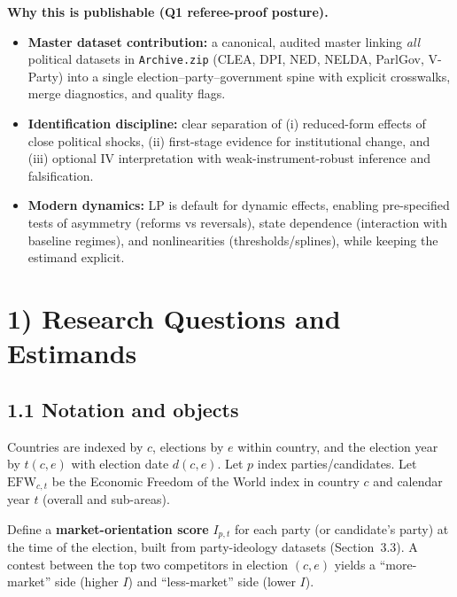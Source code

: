 \documentclass[11pt]{article}
\newcommand{\EFW}{\mathrm{EFW}}
\newcommand{\IV}{\mathrm{IV}}
\newcommand{\1}{\mathbf{1}}
\newcommand{\cid}{c}
\newcommand{\eid}{e}
\begin{document}
\textbf{Why this is publishable (Q1 referee-proof posture).}
\begin{itemize}[leftmargin=1.2em]
\item \textbf{Master dataset contribution:} a canonical, audited master linking \emph{all} political datasets in \texttt{Archive.zip} (CLEA, DPI, NED, NELDA, ParlGov, V-Party) into a single election--party--government spine with explicit crosswalks, merge diagnostics, and quality flags.
\item \textbf{Identification discipline:} clear separation of (i) reduced-form effects of close political shocks, (ii) first-stage evidence for institutional change, and (iii) optional $\IV$ interpretation with weak-instrument-robust inference and falsification.
\item \textbf{Modern dynamics:} LP is default for dynamic effects, enabling pre-specified tests of asymmetry (reforms vs reversals), state dependence (interaction with baseline regimes), and nonlinearities (thresholds/splines), while keeping the estimand explicit.
\end{itemize}

\section*{1) Research Questions and Estimands}

\subsection*{1.1 Notation and objects}
Countries are indexed by $\cid$, elections by $\eid$ within country, and the election year by $t(\cid,\eid)$ with election date $d(\cid,\eid)$.
Let $p$ index parties/candidates. Let $\EFW_{\cid,t}$ be the Economic Freedom of the World index in country $\cid$ and calendar year $t$ (overall and sub-areas).

Define a \textbf{market-orientation score} $I_{p,t}$ for each party (or candidate's party) at the time of the election, built from party-ideology datasets (Section~3.3). A contest between the top two competitors in election $(\cid,\eid)$ yields a ``more-market'' side (higher $I$) and ``less-market'' side (lower $I$).
\end{document}
